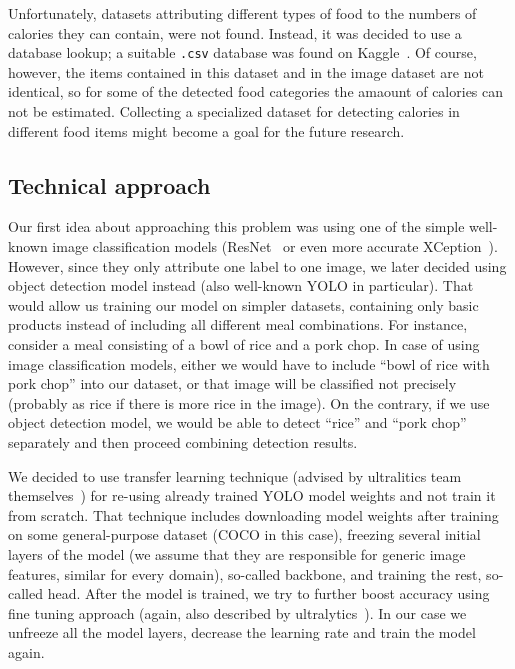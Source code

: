 \documentclass[10pt,twocolumn,letterpaper]{article}
\begin{document}
Unfortunately, datasets attributing different types of food to the numbers of calories they can contain, were not found.
Instead, it was decided to use a database lookup; a suitable \texttt{.csv} database was found on Kaggle~\cite{kaggle-calories}.
Of course, however, the items contained in this dataset and in the image dataset are not identical, so for some of the detected food categories the amaount of calories can not be estimated.
Collecting a specialized dataset for detecting calories in different food items might become a goal for the future research.

\subsection{Technical approach}

Our first idea about approaching this problem was using one of the simple well-known image classification models (ResNet~\cite{he2015deepresiduallearningimage} or even more accurate XCeption~\cite{chollet2017xceptiondeeplearningdepthwise}).
However, since they only attribute one label to one image, we later decided using object detection model instead (also well-known YOLO in particular).
That would allow us training our model on simpler datasets, containing only basic products instead of including all different meal combinations.
For instance, consider a meal consisting of a bowl of rice and a pork chop.
In case of using image classification models, either we would have to include ``bowl of rice with pork chop'' into our dataset, or that image will be classified not precisely (probably as rice if there is more rice in the image).
On the contrary, if we use object detection model, we would be able to detect ``rice'' and ``pork chop'' separately and then proceed combining detection results.

We decided to use transfer learning technique (advised by ultralitics team themselves~\cite{ultralytics2024transferlearning}) for re-using already trained YOLO model weights and not train it from scratch.
That technique includes downloading model weights after training on some general-purpose dataset (COCO in this case), freezing several initial layers of the model (we assume that they are responsible for generic image features, similar for every domain), so-called backbone, and training the rest, so-called head.
After the model is trained, we try to further boost accuracy using fine tuning approach (again, also described by ultralytics~\cite{ultralytics2024finetuning}).
In our case we unfreeze all the model layers, decrease the learning rate and train the model again.
\end{document}
